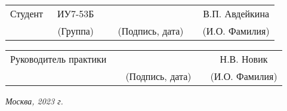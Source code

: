 \noindent
{}
\\

\vspace{1.5cm}
\noindent
\begin{tabular}{l c c c c c}
    Студент      & ~ИУ7-53Б~               & \hspace{3.5cm} & \hspace{3.5cm}                 & &  В.П. Авдейкина \\\cline{2-2}\cline{4-4} \cline{6-6} 
    \hspace{3cm} & {\footnotesize(Группа)} &                & {\footnotesize(Подпись, дата)} & & {\footnotesize(И.О. Фамилия)}
\end{tabular}

\vspace{1cm}

\noindent
\begin{tabular}{l c c c c}
    Руководитель практики & \hspace{5cm}   & \hspace{3.5cm}                 & & Н.В. Новик \\\cline{3-3} \cline{5-5} 
    \hspace{3cm}  &                & {\footnotesize(Подпись, дата)} & & {\footnotesize(И.О. Фамилия)}
\end{tabular}

\begin{center}	
	\vfill
	\large \textit {Москва, 2023 г.}
\end{center}

\thispagestyle{empty}
\pagebreak